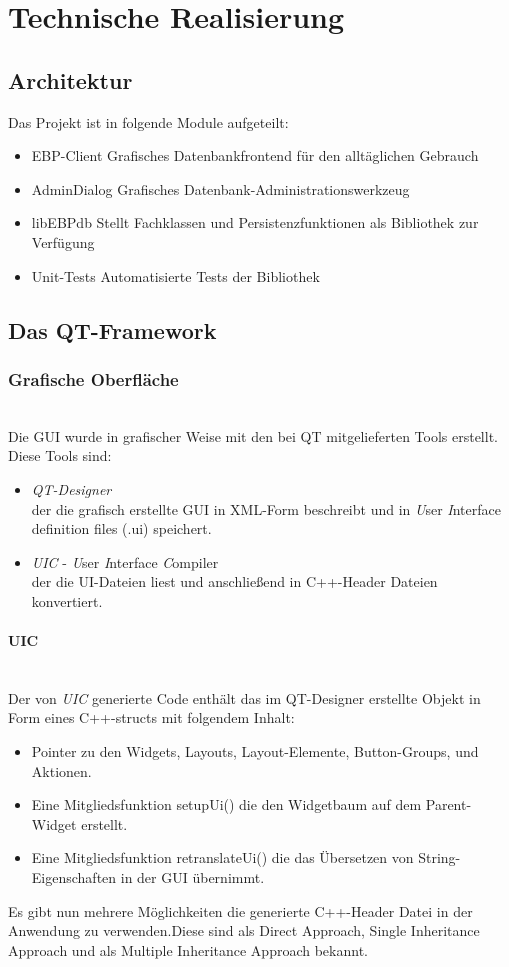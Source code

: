 \section{Technische Realisierung}

\subsection{Architektur}
Das Projekt ist in folgende Module aufgeteilt:
\begin{itemize}
	\item EBP-Client
Grafisches Datenbankfrontend für den alltäglichen Gebrauch
	\item AdminDialog
Grafisches Datenbank-Administrationswerkzeug
	\item libEBPdb
Stellt Fachklassen und Persistenzfunktionen als Bibliothek zur Verfügung
	\item Unit-Tests
Automatisierte Tests der Bibliothek
\end{itemize}

\newpage

\subsection{Das QT-Framework}
\subsubsection{Grafische Oberfläche}\mbox{}\\
Die GUI wurde in grafischer Weise mit den bei QT mitgelieferten Tools erstellt.\\Diese Tools sind:
\begin{itemize}
	\item \textit{QT-Designer}\\[\baselineskip]der die grafisch erstellte GUI in XML-Form beschreibt und in \textit{U}ser \textit{I}nterface definition files (.ui) speichert.
	\item \textit{UIC} - \textit{U}ser \textit{I}nterface \textit{C}ompiler\\[\baselineskip]der die UI-Dateien liest und anschließend in C++-Header Dateien konvertiert.
\end{itemize}
\paragraph{UIC}\mbox{}\\
Der von \textit{UIC} generierte Code enthält das im QT-Designer erstellte Objekt in Form eines C++-structs mit folgendem Inhalt:
\begin{itemize}
	\item Pointer zu den Widgets, Layouts, Layout-Elemente, Button-Groups, und Aktionen.
	\item Eine Mitgliedsfunktion setupUi() die den Widgetbaum auf dem Parent-Widget erstellt.
	\item Eine Mitgliedsfunktion retranslateUi() die das Übersetzen von String-Eigenschaften in der GUI übernimmt.
\end{itemize}
Es gibt nun mehrere Möglichkeiten die generierte C++-Header Datei in der Anwendung zu verwenden.Diese sind als Direct Approach, Single Inheritance Approach und als Multiple Inheritance Approach bekannt.

